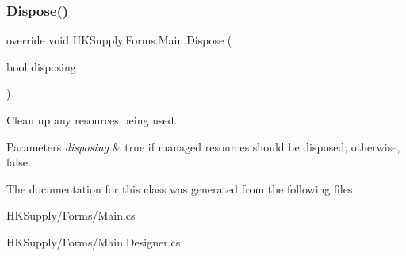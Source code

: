 \subsubsection{\texorpdfstring{Dispose()}{Dispose()}}
{\footnotesize\ttfamily override void H\+K\+Supply.\+Forms.\+Main.\+Dispose (\begin{DoxyParamCaption}\item[{bool}]{disposing }\end{DoxyParamCaption})\hspace{0.3cm}{\ttfamily [protected]}}



Clean up any resources being used. 


\begin{DoxyParams}{Parameters}
{\em disposing} & true if managed resources should be disposed; otherwise, false.\\
\hline
\end{DoxyParams}


The documentation for this class was generated from the following files\+:\begin{DoxyCompactItemize}
\item 
H\+K\+Supply/\+Forms/Main.\+cs\item 
H\+K\+Supply/\+Forms/Main.\+Designer.\+cs\end{DoxyCompactItemize}
